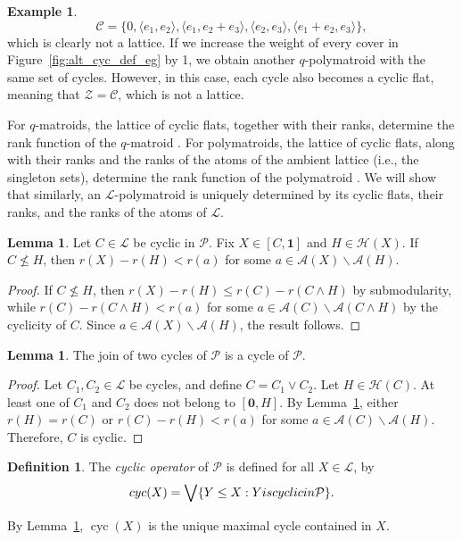 \documentclass[a4paper,11pt,reqno]{article}
\theoremstyle{definition}
\newtheorem{definition}[theorem]{{{Definition}}}
\newtheorem{example}[theorem]{{{Example}}}
\newtheorem{lemma}[theorem]{{{Lemma}}}
\newcommand{\mL}{\mathcal{L}}
\newcommand{\mP}{\mathcal{P}}
\newcommand{\mH}{\mathcal{H}}
\newcommand{\one}{{\mathbf{1}}}
\newcommand{\zero}{{\mathbf{0}}}
\DeclareMathOperator{\cyc}{cyc}
\begin{document}
\begin{example}
    \[
        \mathcal{C} = \{0, \langle e_1, e_2 \rangle, \langle e_1, e_2+e_3 \rangle, 
        \langle e_2, e_3 \rangle, \langle e_1+e_2, e_3 \rangle \},
    \]  
    which is clearly not a lattice. If we increase the weight of every cover in Figure~\ref{fig:alt_cyc_def_eg} by 1, we obtain another $q$-polymatroid with the same set of cycles. However, in this case, each cycle also becomes a cyclic flat, meaning that $\mathcal{Z} = \mathcal{C}$, which is not a lattice.
\end{example}

For $q$-matroids, the lattice of cyclic flats, together with their ranks, determine the rank function of the $q$-matroid \cite{AlfByr22}. For polymatroids, the lattice of cyclic flats, along with their ranks and the ranks of the atoms of the ambient lattice (i.e., the singleton sets), determine the rank function of the polymatroid \cite{Csirm20}. We will show that similarly, an $\mL$-polymatroid is uniquely determined by its cyclic flats, their ranks, and the ranks of the atoms of $\mL$.

\begin{lemma}\label{lem:hyper_cycle}
    Let $C\in\mathcal{L}$ be cyclic in $\mP$. Fix $X\in[C,\one]$ and $H \in\mH(X)$. If $C\nleq H$, then $r(X)-r(H)<r(a)$ for some $a\in\mathcal{A}(X)\backslash\mathcal{A}(H)$.
\end{lemma}
\begin{proof}
    If $C\nleq H$, then $r(X)-r(H)\leq r(C)-r(C\wedge H)$ by submodularity, while $r(C)-r(C\wedge H)<r(a)$ for some $a\in\mathcal{A}(C)\backslash\mathcal{A}(C\wedge H)$ by the cyclicity of $C$. Since $a\in\mathcal{A}(X)\backslash\mathcal{A}(H)$, the result follows.
\end{proof}

\begin{lemma}\label{lem:cyc_join}
    The join of two cycles of $\mP$ is a cycle of $\mP$.
\end{lemma}
\begin{proof}
Let $C_1,C_2\in\mathcal{L}$ be cycles, and define $C=C_1\vee C_2$. Let $H\in\mH(C)$. At least one of $C_1$ and $C_2$ does not belong to $[\zero,H]$. By Lemma~\ref{lem:hyper_cycle}, either $r(H)=r(C)$ or $r(C)-r(H)<r(a)$ for some $a\in\mathcal{A}(C)\backslash\mathcal{A}(H)$. Therefore, $C$ is cyclic.
\end{proof}

\begin{definition}
    The {\em cyclic operator} of $\mP$ is defined for all $X\in\mathcal{L}$, by
    $$\textup{cyc}(X)=\bigvee\{Y\leq X:Y\textup{ is cyclic in } \mP \}.$$
\end{definition}
By Lemma~\ref{lem:cyc_join}, $\cyc(X)$ is the unique maximal cycle contained in $X$.
\end{document}
